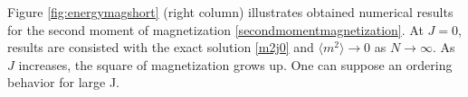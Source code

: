   Figure \ref{fig:energymagshort} (right column) illustrates obtained numerical results for the second moment of magnetization \eqref{secondmomentmagnetization}. At $J=0$, results are consisted with the exact solution \eqref{m2j0} and $  \langle m^2 \rangle  \rightarrow 0$ as $N \rightarrow \infty$. As $J$ increases, the square of magnetization grows up. One can suppose an ordering behavior for large J.
  
 
 
